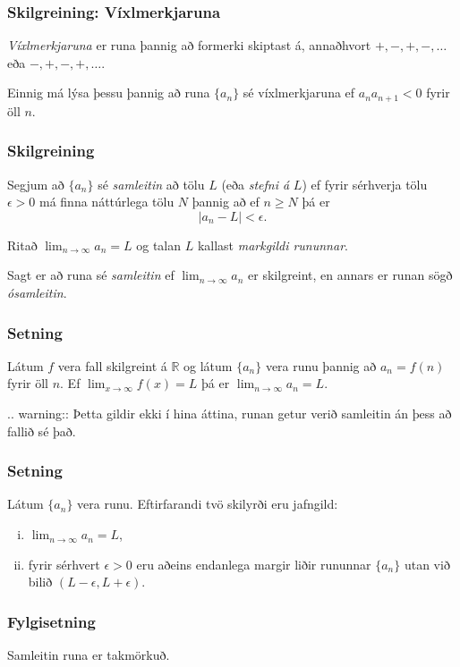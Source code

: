 \documentclass[icelandic,a4paper,12pt]{article}
\newcommand{\R}{{\mathbb  R}}
\begin{document}
\subsubsection{Skilgreining: Víxlmerkjaruna}  
\emph{Víxlmerkjaruna} er runa þannig að formerki skiptast á, annaðhvort
$+, -, +, -, \ldots$ eða  $-, +, -, +, \ldots$. 

Einnig má lýsa þessu þannig að runa $\{a_n\}$ sé víxlmerkjaruna ef $a_na_{n+1}<0$
fyrir öll $n$.

\subsubsection{Skilgreining}
Segjum að $\{a_n\}$ sé \emph{samleitin} að tölu $L$ (eða \emph{stefni á}
$L$) ef fyrir sérhverja tölu $\epsilon>0$ má finna náttúrlega tölu $N$
þannig að ef $n\geq N$ þá er 
$$|a_n-L|<\epsilon.$$

Ritað $\lim_{n\rightarrow \infty}a_n=L$ og talan $L$ kallast \emph{markgildi rununnar}.   

Sagt er að runa sé \emph{samleitin} ef $\lim_{n\rightarrow \infty}a_n$ er skilgreint, 
en annars er runan sögð \emph{ósamleitin}. 

\subsubsection{Setning} 
Látum $f$ vera fall skilgreint á $\R$ og látum $\{a_n\}$ vera runu
þannig að $a_n=f(n)$ fyrir öll $n$.   Ef $\lim_{x\rightarrow
\infty}f(x)=L$ þá er $\lim_{n\rightarrow\infty}a_n=L$.
 
.. warning::
  Þetta gildir ekki í hina áttina, runan getur verið samleitin án þess að fallið sé það.

\subsubsection{Setning}  
Látum $\{a_n\}$ vera runu.  Eftirfarandi tvö skilyrði eru jafngild:
\begin{enumerate}[(i)]
\item $\lim_{n\rightarrow\infty}a_n=L$, 
\item fyrir sérhvert $\epsilon>0$ eru aðeins endanlega margir
liðir rununnar $\{a_n\}$ utan við bilið $(L-\epsilon, L+\epsilon)$.
\end{enumerate}

\subsubsection{Fylgisetning} 
Samleitin runa er takmörkuð. 
\end{document}
